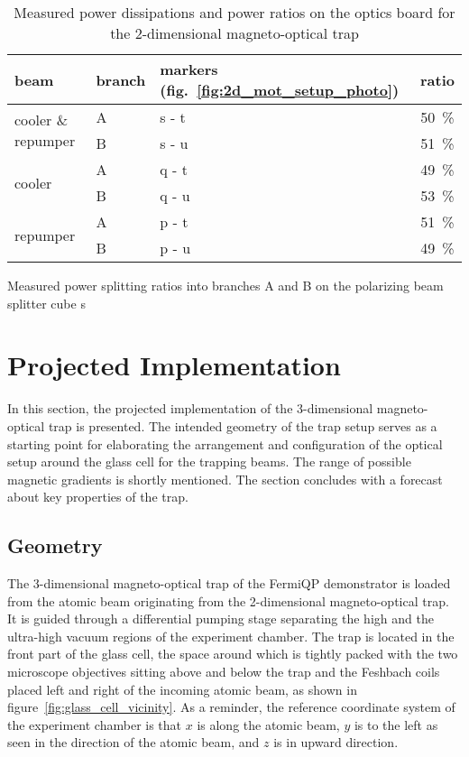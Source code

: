 \begin{table}
    \vspace{0.6cm}
    \begin{subtable}{0.65\textwidth}
        \centering
        \begin{tabular}{lllc}
            \toprule
            \textbf{beam} & \textbf{branch} & \textbf{markers} (fig.~\ref{fig:2d_mot_setup_photo}) & \textbf{ratio} \\
            \toprule
            \multirow{2}{*}{cooler \& repumper} & A & s - t & \SI{50}{\percent} \\
            & B & s - u & \SI{51}{\percent} \\
            \midrule
            \multirow{2}{*}{cooler} & A & q - t & \SI{49}{\percent} \\
            & B & q - u & \SI{53}{\percent} \\
            \midrule
            \multirow{2}{*}{repumper} & A & p - t & \SI{51}{\percent} \\
            & B & p - u & \SI{49}{\percent} \\
            \bottomrule
        \end{tabular}
        \caption{Measured power splitting ratios into branches A and B on the polarizing beam splitter cube s}
        \label{tab:power_splitting}
    \end{subtable}
    
    \caption{Measured power dissipations and power ratios on the optics board for the 2-dimensional magneto-optical trap}
    \label{tab:power_table}
\end{table} 


\section{Projected Implementation}\label{ch:projected_implementation}
In this section, the projected implementation of the 3-dimensional magneto-optical trap is presented. The intended geometry of the trap setup serves as a starting point for elaborating the arrangement and configuration of the optical setup around the glass cell for the trapping beams. The range of possible magnetic gradients is shortly mentioned. The section concludes with a forecast about key properties of the trap.

\subsection*{Geometry}
The 3-dimensional magneto-optical trap of the FermiQP demonstrator is loaded from the atomic beam originating from the 2-dimensional magneto-optical trap. It is guided through a differential pumping stage separating the high and the ultra-high vacuum regions of the experiment chamber. The trap is located in the front part of the glass cell, the space around which is tightly packed with the two microscope objectives sitting above and below the trap and the Feshbach coils placed left and right of the incoming atomic beam, as shown in figure~\ref{fig:glass_cell_vicinity}. As a reminder, the reference coordinate system of the experiment chamber is that $x$ is along the atomic beam, $y$ is to the left as seen in the direction of the atomic beam, and $z$ is in upward direction.

